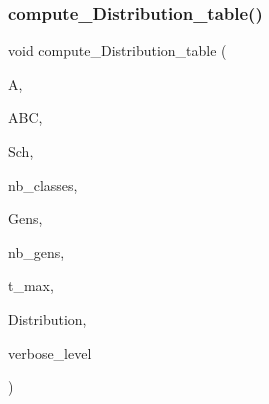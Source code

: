 \subsubsection{\texorpdfstring{compute\+\_\+\+Distribution\+\_\+table()}{compute\_Distribution\_table()}}
{\footnotesize\ttfamily void compute\+\_\+\+Distribution\+\_\+table (\begin{DoxyParamCaption}\item[{\mbox{\hyperlink{classaction}{action}} $\ast$}]{A,  }\item[{\mbox{\hyperlink{classaction__by__conjugation}{action\+\_\+by\+\_\+conjugation}} $\ast$}]{A\+BC,  }\item[{\mbox{\hyperlink{classschreier}{schreier}} $\ast$}]{Sch,  }\item[{\mbox{\hyperlink{galois_8h_a09fddde158a3a20bd2dcadb609de11dc}{I\+NT}}}]{nb\+\_\+classes,  }\item[{\mbox{\hyperlink{galois_8h_a09fddde158a3a20bd2dcadb609de11dc}{I\+NT}} $\ast$$\ast$}]{Gens,  }\item[{\mbox{\hyperlink{galois_8h_a09fddde158a3a20bd2dcadb609de11dc}{I\+NT}}}]{nb\+\_\+gens,  }\item[{\mbox{\hyperlink{galois_8h_a09fddde158a3a20bd2dcadb609de11dc}{I\+NT}}}]{t\+\_\+max,  }\item[{\mbox{\hyperlink{galois_8h_a09fddde158a3a20bd2dcadb609de11dc}{I\+NT}} $\ast$\&}]{Distribution,  }\item[{\mbox{\hyperlink{galois_8h_a09fddde158a3a20bd2dcadb609de11dc}{I\+NT}}}]{verbose\+\_\+level }\end{DoxyParamCaption})}

\mbox{\label{burnside_8_c_af95d10e11c7b51283e5e458a907ea660}} 
